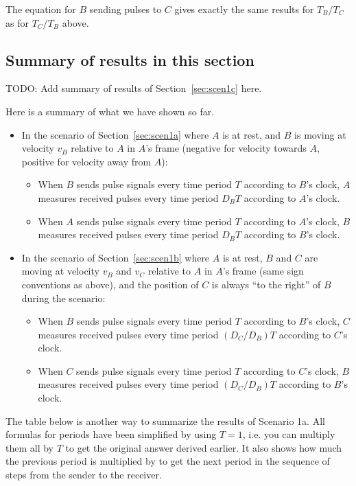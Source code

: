\documentclass[a4paper]{article}
\theoremstyle{plain}
\theoremstyle{definition}
\begin{document}
The equation for $B$ sending pulses to $C$ gives
exactly the same results for $T_B/T_C$ as for $T_C/T_B$ above.


\subsection{Summary of results in this section}
\label{sec:summary}

TODO: Add summary of results of Section~\ref{sec:scen1c} here.

Here is a summary of what we have shown so far.

\begin{itemize}
\item In the scenario of Section~\ref{sec:scen1a} where $A$ is at rest,
  and $B$ is moving at velocity $v_B$ relative to $A$ in $A$'s frame
  (negative for velocity towards $A$, positive for velocity away from
  $A$):
  \begin{itemize}
    \item When $B$ sends pulse signals every time period $T$ according
      to $B$'s clock, $A$ measures received pulses every time period
      $D_B T$ according to $A$'s clock.
    \item When $A$ sends pulse signals every time period $T$ according
      to $A$'s clock, $B$ measures received pulses every time period
      $D_B T$ according to $B$'s clock.
  \end{itemize}
\item In the scenario of Section~\ref{sec:scen1b} where $A$ is at rest,
  $B$ and $C$ are moving at velocity $v_B$ and $v_C$ relative to $A$
  in $A$'s frame (same sign conventions as above), and the position of
  $C$ is always ``to the right'' of $B$ during the scenario:
  \begin{itemize}
    \item When $B$ sends pulse signals every time period $T$ according
      to $B$'s clock, $C$ measures received pulses every time period
      $(D_C/D_B) T$ according to $C$'s clock.
    \item When $C$ sends pulse signals every time period $T$ according
      to $C$'s clock, $B$ measures received pulses every time period
      $(D_C/D_B) T$ according to $B$'s clock.
  \end{itemize}
\end{itemize}

The table below is another way to summarize the results of Scenario 1a.
All formulas for periods have been simplified by using $T=1$, i.e. you
can multiply them all by $T$ to get the original answer derived
earlier.  It also shows how much the previous period is multiplied by
to get the next period in the sequence of steps from the sender to the
receiver.
\end{document}
